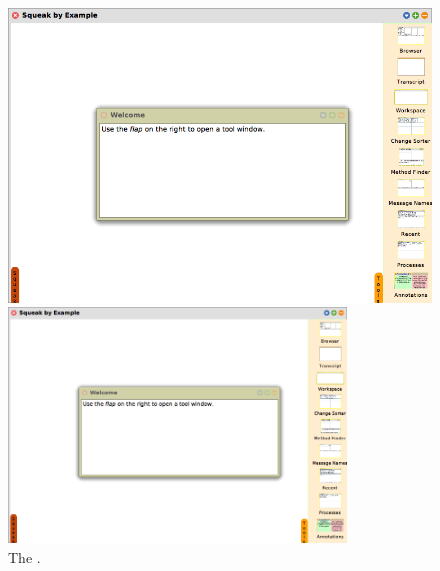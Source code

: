 \documentclass[a4paper,10pt,twoside]{book}
\begin{document}
\begin{figure}[htb]
\ifluluelse
	{\centerline {\includegraphics[width=\textwidth]{Tools}}}
	{\centerline {\includegraphics[width=0.8\textwidth]{Tools}}}
\caption{The \sq \toolsflap.\label{fig:tools}}
\end{figure}
\end{document}
